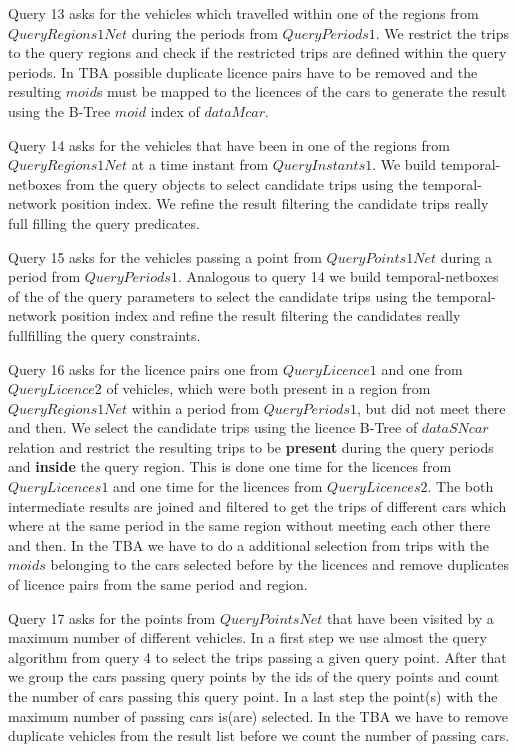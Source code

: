 \documentclass[a4paper]{article}
\newcommand{\op}[1]{\textbf{#1}}
\begin{document}
Query 13 asks for the vehicles which travelled within one of the regions from
$QueryRegions1Net$ during the periods from $QueryPeriods1$. We restrict the trips
to the query regions and check if the restricted trips are defined within the query
periods. In TBA possible duplicate licence pairs have to be removed and the
resulting $moid$s must be mapped to the licences of the cars to generate the result
using the B-Tree $moid$ index of $dataMcar$.

Query 14 asks for the vehicles that have been in one of the regions from $QueryRegions1Net$
at a time instant from $QueryInstants1$. We build temporal-netboxes from the query
objects to select candidate trips using the temporal-network position index. We refine the
result filtering the candidate trips really full filling the query predicates.

Query 15 asks for the vehicles passing a point from $QueryPoints1Net$ during a period
from $QueryPeriods1$. Analogous to query 14 we build temporal-netboxes of the
of the query parameters to select the candidate trips using the temporal-network
position index and refine the result filtering the candidates really fullfilling
the query constraints.

Query 16 asks for the licence pairs one from $QueryLicence1$ and one from $QueryLicence2$
of vehicles, which were both present in a region from $QueryRegions1Net$ within a period
from $QueryPeriods1$, but did not meet there and then. We select the candidate trips
using the licence B-Tree of $dataSNcar$ relation and restrict the resulting trips to be
\op{present} during the query periods and \op{inside} the query region. This is done
one time for the licences from $QueryLicences1$ and one time for the licences from
$QueryLicences2$. The both intermediate results are joined and filtered to get the
trips of different cars which where at the same period in the same region
without meeting each other there and then. In the TBA we have
to do a additional selection from trips with the $moids$ belonging to the cars
selected before by the licences and remove duplicates of licence pairs from the
same period and region.

Query 17 asks for the points from $QueryPointsNet$ that have been visited by a
maximum number of different vehicles. In a first step we use almost the query
algorithm from query 4 to select the trips passing a given query
point. After that we group the cars passing query points by the ids of the
query points and count the number of cars passing this query point. In a last
step the point(s) with the maximum number of passing cars is(are) selected.
In the TBA we have to remove duplicate vehicles from the result list before we
count the number of passing cars.
\end{document}
